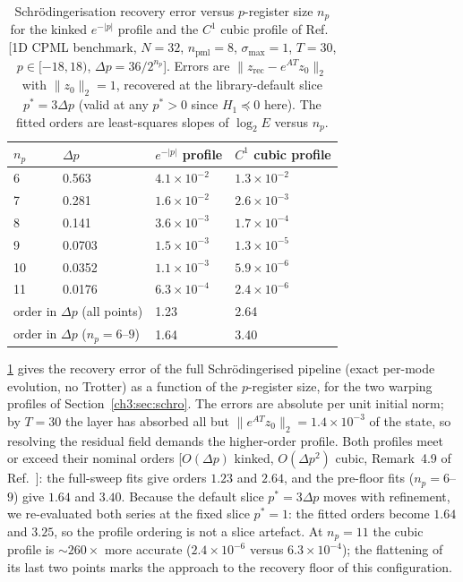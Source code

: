 \begin{table}
\caption{Schr\"odingerisation recovery error versus $p$-register size
$n_p$ for the kinked $e^{-|p|}$ profile and the $C^{1}$ cubic profile of
Ref.~\protect\cite{jin2024recovery} [1D CPML benchmark, $N=32$,
$n_{\mathrm{pml}}=8$, $\sigma_{\max}=1$, $T=30$, $p\in[-18,18)$,
$\Delta p=36/2^{n_p}$].  Errors are
$\lVert z_{\mathrm{rec}}-e^{AT}z_0\rVert_2$ with
$\lVert z_0\rVert_2=1$, recovered at the library-default slice
$p^{*}=3\Delta p$ (valid at any $p^{*}>0$ since $H_1\preceq0$ here).
The fitted orders are least-squares slopes of $\log_2 E$ versus $n_p$.}
\label{ch3:appD:tab:profiles}
\begin{tabular}{llll}
\toprule
$n_p$ & $\Delta p$ & $e^{-|p|}$ profile & $C^{1}$ cubic profile \\
\midrule
6  & 0.563  & $4.1\times10^{-2}$ & $1.3\times10^{-2}$ \\
7  & 0.281  & $1.6\times10^{-2}$ & $2.6\times10^{-3}$ \\
8  & 0.141  & $3.6\times10^{-3}$ & $1.7\times10^{-4}$ \\
9  & 0.0703 & $1.5\times10^{-3}$ & $1.3\times10^{-5}$ \\
10 & 0.0352 & $1.1\times10^{-3}$ & $5.9\times10^{-6}$ \\
11 & 0.0176 & $6.3\times10^{-4}$ & $2.4\times10^{-6}$ \\
\midrule
\multicolumn{2}{l}{order in $\Delta p$ (all points)} & 1.23 & 2.64 \\
\multicolumn{2}{l}{order in $\Delta p$ ($n_p=6$--$9$)} & 1.64 & 3.40 \\
\bottomrule
\end{tabular}
\end{table}

\ref{ch3:appD:tab:profiles} gives the recovery error of the full
Schr\"odingerised pipeline (exact per-mode evolution, no Trotter) as a
function of the $p$-register size, for the two warping profiles of
Section~\ref{ch3:sec:schro}.  The errors are absolute per unit initial norm;
by $T=30$ the layer has absorbed all but
$\lVert e^{AT}z_0\rVert_2=1.4\times10^{-3}$ of the state, so resolving
the residual field demands the higher-order profile.  Both profiles
meet or exceed their nominal orders [$O(\Delta p)$ kinked,
$O(\Delta p^{2})$ cubic, Remark~4.9 of Ref.~\cite{jin2024recovery}]:
the full-sweep fits give orders $1.23$ and $2.64$, and the pre-floor
fits ($n_p=6$--$9$) give $1.64$ and $3.40$.  Because the default slice
$p^{*}=3\Delta p$ moves with refinement, we re-evaluated both series at
the fixed slice $p^{*}=1$: the fitted orders become $1.64$ and $3.25$,
so the profile ordering is not a slice artefact.  At $n_p=11$ the cubic
profile is ${\sim}260\times$ more accurate ($2.4\times10^{-6}$ versus
$6.3\times10^{-4}$); the flattening of its last two points marks the
approach to the recovery floor of this configuration.

